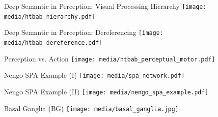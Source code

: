 \documentclass[handout,aspectratio=169]{beamer}
\begin{document}
	\begin{frame}{Deep Semantic in Perception: Visual Processing Hierarchy}
		\centering
		\texttt{[image: media/htbab\_hierarchy.pdf]}
	\end{frame}

	\begin{frame}{Deep Semantic in Perception: Dereferencing}
		\centering
		\vspace{0.5cm}
		\texttt{[image: media/htbab\_dereference.pdf]}\\
		\vspace{0.0575cm}
	\end{frame}

	\begin{frame}{Perception vs. Action}
		\centering
		\texttt{[image: media/htbab\_perceptual\_motor.pdf]}
	\end{frame}

	\begin{frame}{Nengo SPA Example (I)}
		\centering
		\texttt{[image: media/spa\_network.pdf]}
	\end{frame}

	\begin{frame}{Nengo SPA Example (II)}
		\centering
		\texttt{[image: media/nengo\_spa\_example.pdf]}
	\end{frame}

	

	\begin{frame}{Basal Ganglia (BG)}
		\centering
		\texttt{[image: media/basal\_ganglia.jpg]}
	\end{frame}
\end{document}
